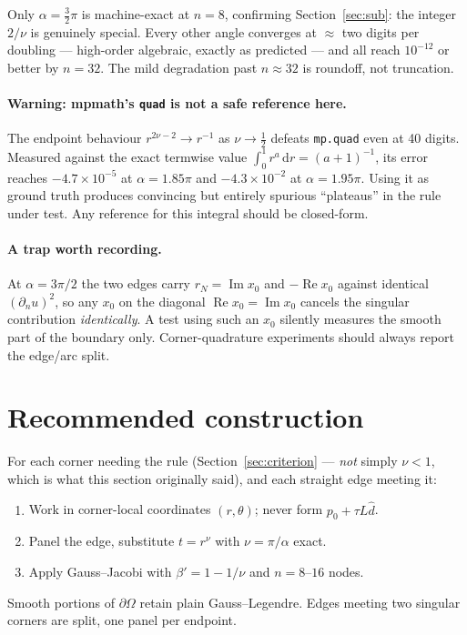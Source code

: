 \documentclass[11pt]{article}
\theoremstyle{remark}
\newcommand{\dd}{\,\mathrm{d}}
\newcommand{\Om}{\Omega}
\begin{document}
\noindent
Only $\alpha=\frac32\pi$ is machine-exact at $n=8$, confirming
Section~\ref{sec:sub}: the integer $2/\nu$ is genuinely special. Every other
angle converges at $\approx$ two digits per doubling --- high-order algebraic,
exactly as predicted --- and all reach $10^{-12}$ or better by $n=32$. The mild
degradation past $n\approx32$ is roundoff, not truncation.

\paragraph{Warning: mpmath's \texttt{quad} is not a safe reference here.}
The endpoint behaviour $r^{2\nu-2}\to r^{-1}$ as $\nu\to\frac12$ defeats
\texttt{mp.quad} even at 40 digits. Measured against the exact termwise value
$\int_0^1 r^a\dd r=(a+1)^{-1}$, its error reaches $-4.7\times10^{-5}$ at
$\alpha=1.85\pi$ and $-4.3\times10^{-2}$ at $\alpha=1.95\pi$. Using it as ground
truth produces convincing but entirely spurious ``plateaus'' in the rule under
test. Any reference for this integral should be closed-form.

\paragraph{A trap worth recording.} At $\alpha=3\pi/2$ the two edges carry
$r_N=\operatorname{Im}x_0$ and $-\operatorname{Re}x_0$ against identical
$(\partial_n u)^2$, so any $x_0$ on the diagonal $\operatorname{Re}x_0=
\operatorname{Im}x_0$ cancels the singular contribution \emph{identically}. A
test using such an $x_0$ silently measures the smooth part of the boundary only.
Corner-quadrature experiments should always report the edge/arc split.

\section{Recommended construction}

For each corner needing the rule (Section~\ref{sec:criterion} --- \emph{not} simply
$\nu<1$, which is what this section originally said), and each straight edge
meeting it:
\begin{enumerate}
\item Work in corner-local coordinates $(r,\theta)$; never form
$p_0+\tau L\hat d$.
\item Panel the edge, substitute $t=r^{\nu}$ with $\nu=\pi/\alpha$ exact.
\item Apply Gauss--Jacobi with $\beta'=1-1/\nu$ and $n=8$--$16$ nodes.
\end{enumerate}
Smooth portions of $\partial\Om$ retain plain Gauss--Legendre. Edges meeting two
singular corners are split, one panel per endpoint.
\end{document}
